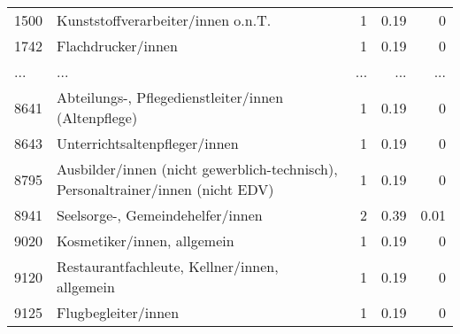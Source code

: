 \begin{longtable}{lXrrr}
        1500 & \multicolumn{1}{X}{Kunststoffverarbeiter/innen o.n.T.} & %
          \num{1} &
          \num[round-mode=places,round-precision=2]{0,19} &
          \num[round-mode=places,round-precision=2]{0} \\
        1742 & \multicolumn{1}{X}{Flachdrucker/innen} & %
          \num{1} &
          \num[round-mode=places,round-precision=2]{0,19} &
          \num[round-mode=places,round-precision=2]{0} \\
       ... & ... & ... & ... & ... \\
        8641 & \multicolumn{1}{X}{Abteilungs-, Pflegedienstleiter/innen (Altenpflege)} & %
          \num{1} &
          \num[round-mode=places,round-precision=2]{0,19} &
          \num[round-mode=places,round-precision=2]{0} \\

        8643 & \multicolumn{1}{X}{Unterrichtsaltenpfleger/innen} & %
          \num{1} &
          \num[round-mode=places,round-precision=2]{0,19} &
          \num[round-mode=places,round-precision=2]{0} \\

        8795 & \multicolumn{1}{X}{Ausbilder/innen (nicht gewerblich-technisch), Personaltrainer/innen (nicht EDV)} & %
          \num{1} &
          \num[round-mode=places,round-precision=2]{0,19} &
          \num[round-mode=places,round-precision=2]{0} \\

        8941 & \multicolumn{1}{X}{Seelsorge-, Gemeindehelfer/innen} & %
          \num{2} &
          \num[round-mode=places,round-precision=2]{0,39} &
          \num[round-mode=places,round-precision=2]{0,01} \\

        9020 & \multicolumn{1}{X}{Kosmetiker/innen, allgemein} & %
          \num{1} &
          \num[round-mode=places,round-precision=2]{0,19} &
          \num[round-mode=places,round-precision=2]{0} \\

        9120 & \multicolumn{1}{X}{Restaurantfachleute, Kellner/innen, allgemein} & %
          \num{1} &
          \num[round-mode=places,round-precision=2]{0,19} &
          \num[round-mode=places,round-precision=2]{0} \\

        9125 & \multicolumn{1}{X}{Flugbegleiter/innen} & %
          \num{1} &
          \num[round-mode=places,round-precision=2]{0,19} &
          \num[round-mode=places,round-precision=2]{0} \\


\end{longtable}
